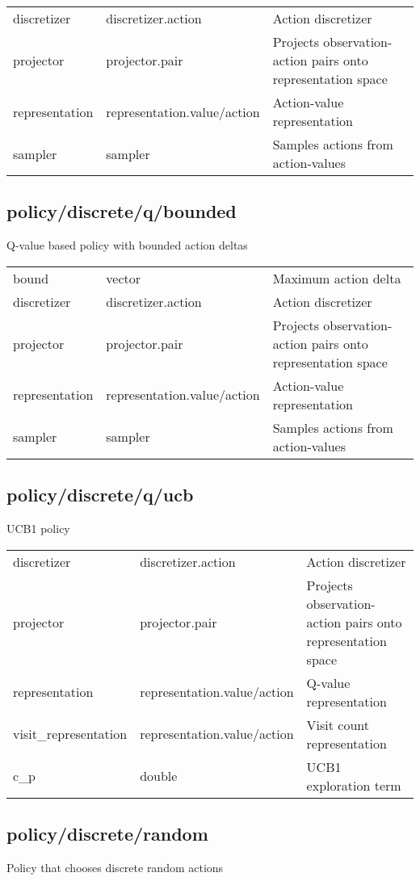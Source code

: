 \noindent\begin{tabular}{@{}lll@{}}
discretizer&discretizer.action&Action discretizer\\
projector&projector.pair&Projects observation-action pairs onto representation space\\
representation&representation.value/action&Action-value representation\\
sampler&sampler&Samples actions from action-values\\
\end{tabular}
\subsection{policy/discrete/q/bounded}
\noindent Q-value based policy with bounded action deltas\\

\noindent\begin{tabular}{@{}lll@{}}
bound&vector&Maximum action delta\\
discretizer&discretizer.action&Action discretizer\\
projector&projector.pair&Projects observation-action pairs onto representation space\\
representation&representation.value/action&Action-value representation\\
sampler&sampler&Samples actions from action-values\\
\end{tabular}
\subsection{policy/discrete/q/ucb}
\noindent UCB1 policy\\

\noindent\begin{tabular}{@{}lll@{}}
discretizer&discretizer.action&Action discretizer\\
projector&projector.pair&Projects observation-action pairs onto representation space\\
representation&representation.value/action&Q-value representation\\
visit\_representation&representation.value/action&Visit count representation\\
c\_p&double&UCB1 exploration term\\
\end{tabular}
\subsection{policy/discrete/random}
\noindent Policy that chooses discrete random actions\\

